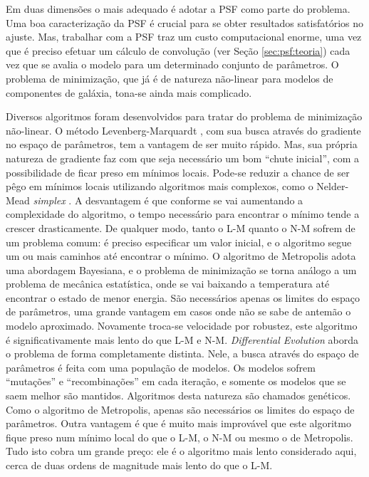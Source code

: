 Em duas dimensões o mais adequado é adotar a PSF como parte do problema. Uma boa
caracterização da PSF é crucial para se obter resultados satisfatórios no
ajuste. Mas, trabalhar com a PSF traz um custo computacional enorme, uma vez que
é preciso efetuar um cálculo de convolução (ver Seção \ref{sec:psf:teoria}) cada
vez que se avalia o modelo para um determinado conjunto de parâmetros. O
problema de minimização, que já é de natureza não-linear para modelos de
componentes de galáxia, tona-se ainda mais complicado.

Diversos algoritmos foram desenvolvidos para tratar do problema de minimização
não-linear. O método Levenberg-Marquardt \citep[daqui em diante
L-M]{Levenberg1944, Marquardt1963}, com sua busca através do gradiente no espaço
de parâmetros, tem a vantagem de ser muito rápido. Mas, sua própria natureza de
gradiente faz com que seja necessário um bom ``chute inicial'', com a
possibilidade de ficar preso em mínimos locais. Pode-se reduzir a chance de ser
pêgo em mínimos locais utilizando algoritmos mais complexos, como o Nelder-Mead
{\em simplex} \citep[daqui em diante N-M]{Nelder1965}. A desvantagem é que
conforme se vai aumentando a complexidade do algoritmo, o tempo necessário para
encontrar o mínimo tende a crescer drasticamente. De qualquer modo, tanto o L-M
quanto o N-M sofrem de um problema comum: é preciso especificar um valor
inicial, e o algoritmo segue um ou mais caminhos até encontrar o mínimo. O
algoritmo de Metropolis \citep{Metropolis1953, Saha1994} adota uma abordagem
Bayesiana, e o problema de minimização se torna análogo a um problema de
mecânica estatística\fixme, onde se vai baixando a temperatura até encontrar o
estado de menor energia. São necessários apenas os limites do espaço de
parâmetros, uma grande vantagem em casos onde não se sabe de antemão o modelo
aproximado. Novamente troca-se velocidade por robustez, este algoritmo é
significativamente mais lento do que L-M e N-M. {\em Differential Evolution}
\citep[daqui em diante DE]{Storn1997} aborda o problema de forma completamente
distinta. Nele, a busca através do espaço de parâmetros é feita com uma
população de modelos. Os modelos sofrem ``mutações'' e ``recombinações'' em cada
iteração, e somente os modelos que se saem melhor são mantidos. Algoritmos desta
natureza são chamados genéticos. Como o algoritmo de Metropolis, apenas são
necessários os limites do espaço de parâmetros. Outra vantagem é que é muito
mais improvável que este algoritmo fique preso num mínimo local do que o L-M, o
N-M ou mesmo o de Metropolis. Tudo isto cobra um grande preço: ele é o algoritmo
mais lento considerado aqui, cerca de duas ordens de magnitude mais lento do que
o L-M.

